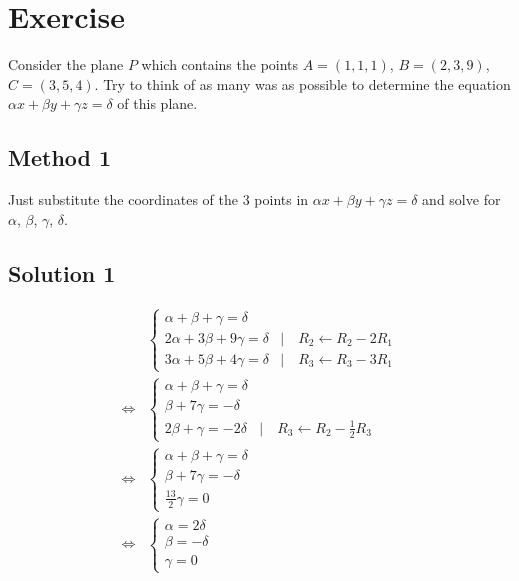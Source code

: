 \documentclass[a4paper,10pt]{article}
\begin{document}
\clearpage

\section{Exercise}

Consider the plane $P$ which contains the points $A = (1, 1, 1)$, $B = (2, 3, 9)$, $C = (3, 5, 4)$. Try to think of as many was as possible to determine the equation $\alpha x + \beta y + \gamma z = \delta$ of this plane.

\subsection{Method 1}
Just substitute the coordinates of the 3 points in $\alpha x + \beta y + \gamma z = \delta$ and solve for $\alpha$, $\beta$, $\gamma$, $\delta$.

\subsection{Solution 1}
\begin{align*}
     & \begin{cases}
           \alpha + \beta + \gamma = \delta                                        \\
           2\alpha + 3\beta + 9\gamma = \delta & |\quad R_2 \leftarrow R_2 - 2 R_1 \\
           3\alpha + 5\beta + 4\gamma = \delta & |\quad R_3 \leftarrow R_3 - 3 R_1
       \end{cases} \\ \iff &
    \begin{cases}
        \alpha + \beta + \gamma = \delta                                        \\
        \beta + 7\gamma = -\delta                                               \\
        2\beta + \gamma = -2\delta & |\quad R_3 \leftarrow R_2 - \frac{1}{2}R_3
    \end{cases}    \\ \iff &
    \begin{cases}
        \alpha + \beta + \gamma = \delta \\
        \beta + 7\gamma = -\delta        \\
        \frac{13}{2}\gamma = 0
    \end{cases}                                           \\ \iff &
    \begin{cases}
        \alpha = 2\delta \\
        \beta = -\delta  \\
        \gamma = 0
    \end{cases}
\end{align*}
\end{document}
